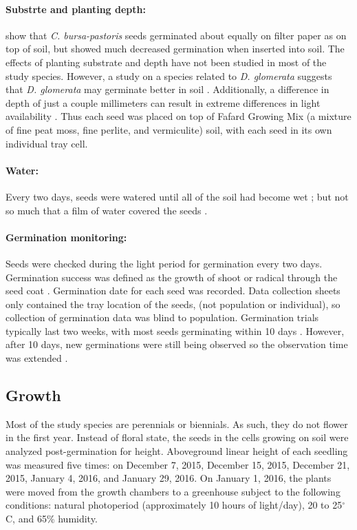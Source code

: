 \documentclass[12pt]{article}\usepackage[]{graphicx}\usepackage[]{color}
\begin{document}
	\paragraph{Substrte and planting depth:} \textcite{Popay1970} show that \textit{C. bursa-pastoris} seeds germinated about equally on filter paper as on top of soil, but showed much decreased germination when inserted into soil. The effects of planting substrate and depth have not been studied in most of the study species. However, a study on a species related to \textit{D. glomerata} suggests that \textit{D. glomerata} may germinate better in soil \parencite{Andrews1974}. Additionally, a difference in depth of just a couple millimeters can result in extreme differences in light availability \parencite{Tester1987}. Thus each seed was placed on top of Fafard Growing Mix (a mixture of fine peat moss, fine perlite, and vermiculite) soil, with each seed in its own individual tray cell.
	
	\paragraph{Water:} Every two days, seeds were watered until all of the soil had become wet \parencite{Steinbauer1957}; but not so much that a film of water covered the seeds \parencite{AOSA1960}.
	
	\paragraph{Germination monitoring:} Seeds were checked during the light period for germination every two days. Germination success was defined as the growth of shoot or radical through the seed coat \parencite{Baskin1998,Popay1970}. Germination date for each seed was recorded. Data collection sheets only contained the tray location of the seeds, (not population or individual), so collection of germination data was blind to population.  Germination trials typically last two weeks, with most seeds germinating within 10 days \parencite{Baskin1998}. However, after 10 days, new germinations were still being observed so the observation time was extended \parencite{Wulff1994}.
	
	\subsection{Growth}
 	Most of the study species are perennials or biennials. As such, they do not flower in the first year. Instead of floral state, the seeds in the cells growing on soil were analyzed post-germination for height. Aboveground linear height of each seedling was measured five times: on December 7, 2015, December 15, 2015, December 21, 2015, January 4, 2016, and January 29, 2016. On January 1, 2016, the plants were moved from the growth chambers to a greenhouse subject to the following conditions: natural photoperiod (approximately 10 hours of light/day), 20 to 25$^\circ$C, and 65\% humidity.  
 	
\end{document}
